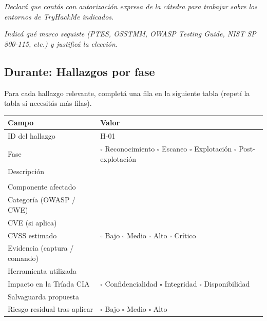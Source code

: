 \documentclass[11pt,a4paper]{article}
\begin{document}
\begin{campo}[Autorización]
\textit{Declará que contás con autorización expresa de la cátedra para trabajar sobre los entornos de TryHackMe indicados.}
\vspace{1cm}
\end{campo}

\begin{campo}
\textit{Indicá qué marco seguiste (PTES, OSSTMM, OWASP Testing Guide, NIST SP 800-115, etc.) y justificá la elección.}
\vspace{2cm}
\end{campo}

\subsection{Durante: Hallazgos por fase}

Para cada hallazgo relevante, completá una fila en la siguiente tabla (repetí la tabla si necesitás más filas).

\begin{center}
\renewcommand{\arraystretch}{1.5}
\begin{longtable}{@{} p{3.5cm} p{10cm} @{}}
\toprule
\textbf{Campo} & \textbf{Valor} \\
\midrule
ID del hallazgo & H-01 \\
\midrule
Fase & $\square$ Reconocimiento $\square$ Escaneo $\square$ Explotación $\square$ Post-explotación \\
\midrule
Descripción & \\
& \vspace{2cm} \\
\midrule
Componente afectado & \\
\midrule
Categoría (OWASP / CWE) & \\
\midrule
CVE (si aplica) & \\
\midrule
CVSS estimado & $\square$ Bajo $\square$ Medio $\square$ Alto $\square$ Crítico \\
\midrule
Evidencia (captura / comando) & \vspace{2cm} \\
\midrule
Herramienta utilizada & \\
\midrule
Impacto en la Tríada CIA & $\square$ Confidencialidad $\square$ Integridad $\square$ Disponibilidad \\
\midrule
Salvaguarda propuesta & \vspace{2cm} \\
\midrule
Riesgo residual tras aplicar & $\square$ Bajo $\square$ Medio $\square$ Alto \\
\bottomrule
\end{longtable}
\end{center}
\end{document}
